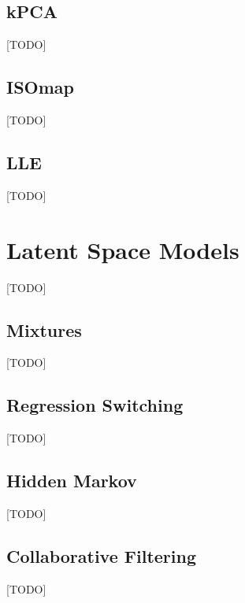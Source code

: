 \documentclass[12pt,a4paper]{article}
\theoremstyle{plain}
\theoremstyle{definition}
\begin{document}
\subsection{kPCA}
[TODO]

\subsection{ISOmap}
[TODO]


\subsection{LLE}
[TODO]


\section{Latent Space Models}
\label{sec:latent_space}
[TODO]


\subsection{Mixtures}
[TODO]


\subsection{Regression Switching}
[TODO]



\subsection{Hidden Markov}
[TODO]


\subsection{Collaborative Filtering}
[TODO]




\newpage
\listofalgorithms




\end{document}
